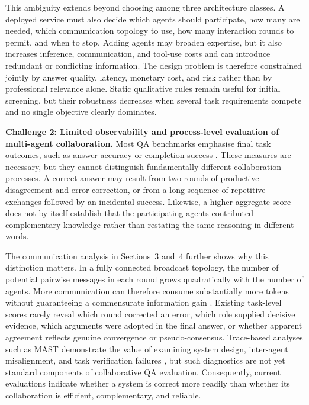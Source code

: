 This ambiguity extends beyond choosing among three architecture classes. A
deployed service must also decide which agents should participate, how many
are needed, which communication topology to use, how many interaction rounds
to permit, and when to stop. Adding agents may broaden expertise, but it also
increases inference, communication, and tool-use costs and can introduce
redundant or conflicting information. The design problem is therefore
constrained jointly by answer quality, latency, monetary cost, and risk rather
than by professional relevance alone. Static qualitative rules remain useful
for initial screening, but their robustness decreases when several task
requirements compete and no single objective clearly dominates.

\textbf{Challenge 2: Limited observability and process-level evaluation of
multi-agent collaboration.}
Most QA benchmarks emphasise final task outcomes, such as answer accuracy or
completion success \citep{hendrycks2021mmlu,yang2018hotpotqa,
liu2024agentbench,mialon2024gaia}. These measures are necessary, but they
cannot distinguish fundamentally different collaboration processes. A
correct answer may result from two rounds of productive disagreement and
error correction, or from a long sequence of repetitive exchanges followed
by an incidental success. Likewise, a higher aggregate score does not by
itself establish that the participating agents contributed complementary
knowledge rather than restating the same reasoning in different words.

The communication analysis in Sections~3 and~4 further shows why this
distinction matters. In a fully connected broadcast topology, the number of
potential pairwise messages in each round grows quadratically with the number
of agents. More communication can therefore consume substantially more
tokens without guaranteeing a commensurate information gain
\citep{qian2024scaling_multiagent}. Existing task-level scores rarely reveal
which round corrected an error, which role supplied decisive evidence, which
arguments were adopted in the final answer, or whether apparent agreement
reflects genuine convergence or pseudo-consensus. Trace-based analyses such as
MAST demonstrate the value of examining system design, inter-agent
misalignment, and task verification failures \citep{han2024mast}, but such
diagnostics are not yet standard components of collaborative QA evaluation.
Consequently, current evaluations indicate whether a system is correct more
readily than whether its collaboration is efficient, complementary, and
reliable.

